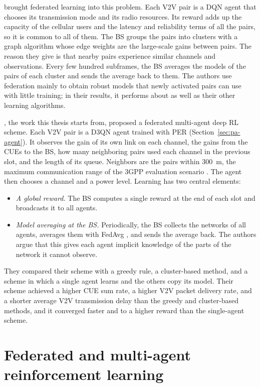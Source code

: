 \citet{zhang+20v2xfed} brought federated learning into this problem. Each \ac{V2V} pair is a \ac{DQN}
agent that chooses its transmission mode and its radio resources. Its reward adds up the capacity of the
cellular users and the latency and reliability terms of all the pairs, so it is common to all of them. The
\ac{BS} groups the pairs into clusters with a graph algorithm whose edge weights are the large-scale gains
between pairs. The reason they give is that nearby pairs experience similar channels and observations.
Every few hundred subframes, the \ac{BS} averages the models of the pairs of each cluster and sends the
average back to them. The authors use federation mainly to obtain robust models that newly activated pairs
can use with little training; in their results, it performs about as well as their other learning
algorithms.

\citet{li+22fedmarl}, the work this thesis starts from, proposed a federated multi-agent deep \ac{RL}
scheme. Each \ac{V2V} pair is a \ac{D3QN} agent trained with \ac{PER} (Section~\ref{sec:pa-agent}). It
observes the gain of its own link on each channel, the gains from the \acp{CUE} to the \ac{BS}, how many
neighboring pairs used each channel in the previous slot, and the length of its queue. Neighbors are the
pairs within \SI{300}{\meter}, the maximum communication range of the \ac{3GPP} evaluation scenario
\cite{3gpp16v2x}. The agent then chooses a channel and a power level. Learning has two central
elements:
\begin{itemize}[nosep]
  \item \emph{A global reward.} The \ac{BS} computes a single reward at the end of each slot and
    broadcasts it to all agents.
  \item \emph{Model averaging at the \ac{BS}.} Periodically, the \ac{BS} collects the networks of all
    agents, averages them with \ac{FedAvg} \cite{mcmahan+17fedavg}, and sends the average back. The
    authors argue that this gives each agent implicit knowledge of the parts of the network it cannot
    observe.
\end{itemize}
They compared their scheme with a greedy rule, a cluster-based method, and a scheme in which a single
agent learns and the others copy its model. Their scheme achieved a higher \ac{CUE} sum rate, a higher
\ac{V2V} packet delivery rate, and a shorter average \ac{V2V} transmission delay than the greedy and
cluster-based methods, and it converged faster and to a higher reward than the single-agent scheme.

\section{Federated and multi-agent reinforcement learning}
\label{sec:rw-frl}

